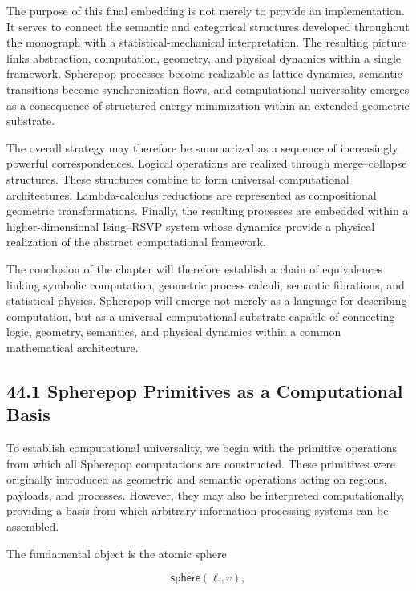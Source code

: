 \documentclass[12pt,letterpaper]{article}
\theoremstyle{remark}
\begin{document}
The purpose of this final embedding is not merely to provide an implementation. It serves to connect the semantic and categorical structures developed throughout the monograph with a statistical-mechanical interpretation. The resulting picture links abstraction, computation, geometry, and physical dynamics within a single framework. Spherepop processes become realizable as lattice dynamics, semantic transitions become synchronization flows, and computational universality emerges as a consequence of structured energy minimization within an extended geometric substrate.

The overall strategy may therefore be summarized as a sequence of increasingly powerful correspondences. Logical operations are realized through merge--collapse structures. These structures combine to form universal computational architectures. Lambda-calculus reductions are represented as compositional geometric transformations. Finally, the resulting processes are embedded within a higher-dimensional Ising--RSVP system whose dynamics provide a physical realization of the abstract computational framework.

The conclusion of the chapter will therefore establish a chain of equivalences linking symbolic computation, geometric process calculi, semantic fibrations, and statistical physics. Spherepop will emerge not merely as a language for describing computation, but as a universal computational substrate capable of connecting logic, geometry, semantics, and physical dynamics within a common mathematical architecture.

\subsection{44.1 Spherepop Primitives as a Computational Basis}

To establish computational universality, we begin with the primitive operations from which all Spherepop computations are constructed. These primitives were originally introduced as geometric and semantic operations acting on regions, payloads, and processes. However, they may also be interpreted computationally, providing a basis from which arbitrary information-processing systems can be assembled.

The fundamental object is the atomic sphere

\[
\mathsf{sphere}(\ell,v),
\]
\end{document}
